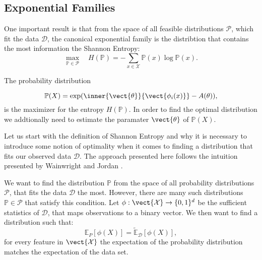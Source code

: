     
    \subsection{Exponential Families}
    \label{ssec:expf}
    One important result is that from the space of all feasible distributions $\mathcal{P}$, which fit the data $\mathcal{D}$, the canonical exponential family is the distribtion that contains the most information \wrt the Shannon Entropy:
    \begin{equation}
    \max_{\mathbb{P}\in \mathcal{P}} \quad  H(\mathbb{P}) = - \sum_{x\in\mathcal{X}} \mathbb{P}(x) \log \mathbb{P}(x).
    \end{equation}

    The probability distribution

    \begin{equation}
        \mathbb{P}(X) = \exp(\inner{\vect{\theta}}{\vect{\phi_i(x)}} - A(\theta)),
    \end{equation}
    is the maximizer for the entropy $H(\mathbb{P})$.
    In order to find the optimal distribution we addtionally need to estimate the paramater $\vect{\theta}$ of $\mathbb{P}(X)$.

    Let us start with the definition of Shannon Entropy and why it is necessary to introduce some notion of optimality when it comes to finding a distribution that fits our observed data $\mathcal{D}$.
    The approach presented here follows the intuition presented by Wainwright and Jordan \cite{wainwright2008graphical}.

    We want to find the distribution $\mathbb{P}$ from the space of all probability distributions $\mathcal{P}$, that fits the data  $\mathcal{D}$ the most.
    However,  there are many such distributions $\mathbb{P} \in \mathcal{P}$ that satisfy this condition. 
    Let $\phi: \vect{\mathcal{X}}  \rightarrow \{0,1\}^d$ be the sufficient statistics of $\mathcal{D}$, that maps observations to a binary vector. 
    We then want to find a distribution such that:
    \begin{equation}
        \label{eq:expecval}
        \mathbb{E}_P[\phi(X)] = \tilde{\mathbb{E}}_{\mathcal{D}}[\phi(X)], 
    \end{equation}
    for every feature in $\vect{\mathcal{X}}$ the expectation of the probability distribution matches the expectation of the data set.

